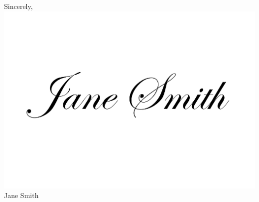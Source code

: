 \documentclass[a4paper,10.5pt,oneside]{article}
\begin{document}
\vspace{1em}

\begin{flushleft}
Sincerely, \\
\vspace{1em} 
\includegraphics[trim=0cm 8cm 0cm 7cm, crop=true, scale=0.15]{Signature.pdf} \\ %
\vspace{1em} 
Jane Smith \\
\end{flushleft}
\end{document}
